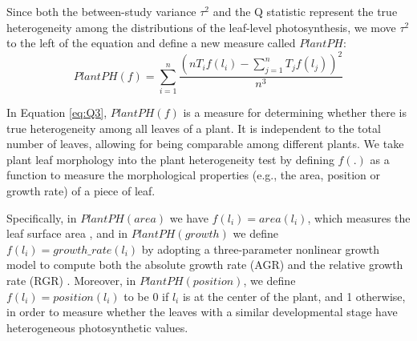 \documentclass{bioinfo}
\begin{document}
{\begin{methods}
Since both the between-study variance $\tau^2$ and the Q statistic represent the true heterogeneity among the distributions of the leaf-level photosynthesis, we move $\tau^2$ to the left of the equation and define a new measure called $PlantPH$:
%
\begin{equation}\label{eq:Q3}
PlantPH(f)=\sum_{i=1}^n\frac{\left(nT_if(l_i)-\sum_{j=1}^n T_jf(l_j)\right)^2}{n^3}
\end{equation}

In Equation \ref{eq:Q3}, $PlantPH(f)$ is a measure for determining whether there is true heterogeneity among all leaves of a plant. It is independent to the total number of leaves, allowing for being comparable among different plants. We take plant leaf morphology into the plant heterogeneity test by defining $f(.)$ as a function to measure the morphological properties (e.g., the area, position or growth rate) of a piece of leaf.

Specifically, in $PlantPH(area)$ we have $f(l_i)=area(l_i)$, which measures the leaf surface area \citep{boyes2001growth,tessmer2013functional}, and in $PlantPH(growth)$ we define $f(l_i)=growth\_rate(l_i)$ by adopting a three-parameter nonlinear growth model to compute both the absolute growth rate (AGR) and the relative growth rate (RGR) \citep{Richards1959,hunt1982plant,tessmer2013functional}. Moreover, in $PlantPH(position)$, we define $f(l_i)=position(l_i)$ to be 0 if $l_i$ is at the center of the plant, and 1 otherwise, in order to measure whether the leaves with a similar developmental stage have heterogeneous photosynthetic values.


%
%
%
%
\end{methods}
}
\end{document}
